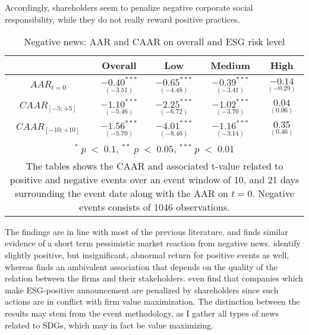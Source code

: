 Accordingly, shareholders seem to penalize negative corporate social responsibility, while they do not really reward positive practices. 

\begin{table}[H]
\centering
\caption{Negative news: AAR and CAAR on overall and ESG risk level} 
\begin{tabular}{ccccc}
  \hline  \hline
  & \multicolumn{1}{c}{Overall} &  \multicolumn{1}{c}{Low} & \multicolumn{1}{c}{Medium} & \multicolumn{1}{c}{High}\\  
 \hline
$AAR_{t=0}$ &   $\underset{(-3.51)}{-0.40^{***}}$ &   $\underset{(-4.48)}{-0.65^{***}}$ &   $\underset{(-3.41)}{-0.39^{***}}$ &   $\underset{(-0.29)}{-0.14 }$ \\

$CAAR_{[-5;+5]}$  &  $\underset{(-5.46)}{-1.10^{***}}$ &   $\underset{(-6.72)}{-2.25^{***}}$ &   $\underset{(-3.70)}{-1.02^{***}}$ &   $\underset{(0.06)}{0.04}$ \\ 

$CAAR_{[-10;+10]}$    & $\underset{(-5.70)}{-1.56^{***}}$ &   $\underset{(-8.46)}{-4.01^{***}}$ &   $\underset{(-3.14)}{-1.16^{***}}$ &   $\underset{(0.46)}{0.35}$ \\ 
   \hline \hline
   \multicolumn{5}{p{12cm}}{ \footnotesize $^* \; p\; <\; 0.1$, $ ^{**} \; p\; <\; 0.05$, $ ^{***} \; p\; <\; 0.01$  } \\
   \multicolumn{5}{p{13cm}}{\footnotesize The tables shows the CAAR and associated t-value related to positive and negative events over an event window of 10, and 21 days surrounding the event date along with the AAR on $t=0$. Negative events consists of 1046 observations. } \\
   \hline
\end{tabular}
\label{tab: ST_neg_significance}
\end{table}

The findings are in line with most of the previous literature. \cite{Blancard_ESG_sentiment} and \citep{kruger2015corporate} finds similar evidence of a short term pessimistic market reaction from negative news. \citeauthor{Blancard_ESG_sentiment} identify slightly positive, but insignificant, abnormal return for positive events as well, whereas \citeauthor{kruger2015corporate} finds an ambivalent association that depends on the quality of the relation between the firms and their stakeholders. \cite{fisher2011voluntary} even find that companies which make ESG-positive announcement are penalized by shareholders since such actions are in conflict with firm value maximization. The distinction between the results may stem from the event methodology, as I gather all types of news related to SDGs, which may in fact be value maximizing. 

